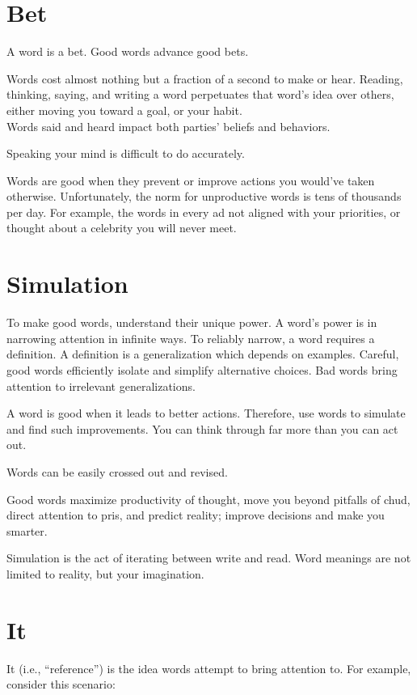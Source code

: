 \documentclass[
]{book}
\begin{document}
\section{Bet}\label{word-bet}

A word is a bet.
Good words advance good bets.

Words cost almost nothing but a fraction of a second to make or hear.
Reading, thinking, saying, and writing a word perpetuates that word's idea over others, either moving you toward a goal, or your habit.\\
Words said and heard impact both parties' beliefs and behaviors.

Speaking your mind is difficult to do accurately.

Words are good when they prevent or improve actions you would've taken otherwise.
Unfortunately, the norm for unproductive words is tens of thousands per day.
For example, the words in every ad not aligned with your priorities, or thought about a celebrity you will never meet.

\section{Simulation}\label{simulation}

To make good words, understand their unique power.
A word's power is in narrowing attention in infinite ways.
To reliably narrow, a word requires a definition.
A definition is a generalization which depends on examples.
Careful, good words efficiently isolate and simplify alternative choices.
Bad words bring attention to irrelevant generalizations.

A word is good when it leads to better actions.
Therefore, use words to simulate and find such improvements.
You can think through far more than you can act out.

Words can be easily crossed out and revised.

Good words maximize productivity of thought, move you beyond pitfalls of chud, direct attention to pris, and predict reality; improve decisions and make you smarter.

Simulation is the act of iterating between write and read.
Word meanings are not limited to reality, but your imagination.

\section{It}\label{it}

It (i.e., ``reference'') is the idea words attempt to bring attention to.
For example, consider this scenario:
\end{document}
